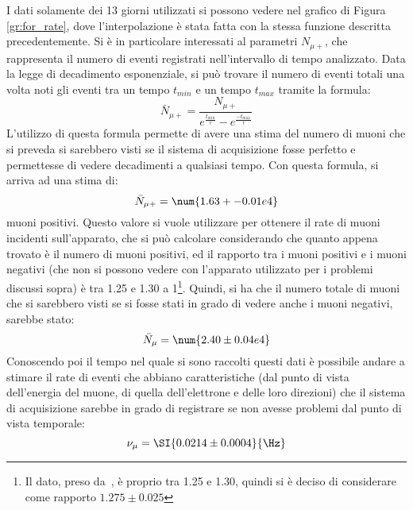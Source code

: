 I dati solamente dei 13 giorni utilizzati si possono vedere nel grafico di Figura \ref{gr:for_rate}, dove l'interpolazione è stata fatta con la stessa funzione descritta precedentemente. Si è in particolare interessati al parametri $N_{\mu+}$, che rappresenta il numero di eventi registrati nell'intervallo di tempo analizzato. 
Data la legge di decadimento esponenziale, si può trovare il numero di eventi totali una volta noti gli eventi tra un tempo $t_\textit{min}$ e un tempo $t_\textit{max}$  tramite la formula:
\begin{equation}
  \bar{N}_{\mu+} = \frac{N_{\mu+}}{e^{\frac{t_\textit{min}}{\tau}}-e^{\frac{-t_\textit{max}}{\tau}}}
  \label{eq:tot_mup}
\end{equation}
L'utilizzo di questa formula permette di avere una stima del numero di muoni che si preveda si sarebbero visti se il sistema di acquisizione fosse perfetto e permettesse di vedere decadimenti a qualsiasi tempo. Con questa formula, si arriva ad una stima di:
\begin{equation}
  \bar{N}_{\mu+} = \num{1.63+-0.01e4}
\end{equation}
muoni positivi. 
Questo valore si vuole utilizzare per ottenere il rate di muoni incidenti sull'apparato, che si può calcolare considerando che quanto appena trovato è il numero di muoni positivi, ed il rapporto tra i muoni positivi e i muoni negativi (che non si possono vedere con l'apparato utilizzato per i problemi discussi sopra) è tra 1.25 e 1.30 a 1\footnote{Il dato, preso da~\cite{bib:Patrignani:2016xqp}, è proprio tra  1.25 e 1.30, quindi si è deciso di considerare come rapporto $1.275\pm0.025$}. 
Quindi, si ha che il numero totale di muoni che si sarebbero visti se si fosse stati in grado di vedere anche i muoni negativi, sarebbe stato:
\begin{equation}
  \bar{N}_{\mu} = \num{2.40 \pm 0.04e4}
\end{equation}
Conoscendo poi il tempo nel quale si sono raccolti questi dati è possibile andare a stimare il rate di eventi che abbiano caratteristiche (dal punto di vista dell'energia del muone, di quella dell'elettrone e delle loro direzioni) che il sistema di acquisizione sarebbe in grado di registrare se non avesse problemi dal punto di vista temporale:
\begin{equation}
  \nu_\mu = \SI{0.0214 \pm 0.0004}{\Hz}
\end{equation}
